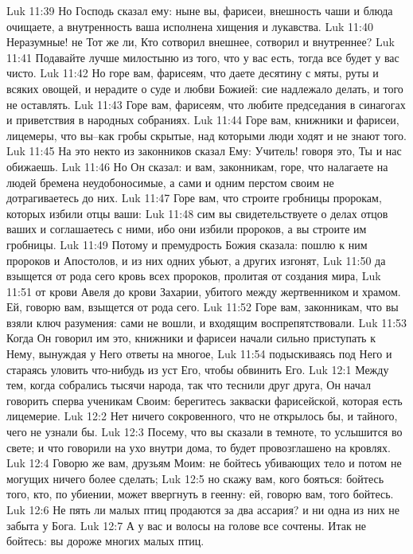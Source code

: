Luk 11:39  Но Господь сказал ему: ныне вы, фарисеи, внешность чаши и блюда очищаете, а внутренность ваша исполнена хищения и лукавства.
Luk 11:40  Неразумные! не Тот же ли, Кто сотворил внешнее, сотворил и внутреннее?
Luk 11:41  Подавайте лучше милостыню из того, что у вас есть, тогда все будет у вас чисто.
Luk 11:42  Но горе вам, фарисеям, что даете десятину с мяты, руты и всяких овощей, и нерадите о суде и любви Божией: сие надлежало делать, и того не оставлять.
Luk 11:43  Горе вам, фарисеям, что любите председания в синагогах и приветствия в народных собраниях.
Luk 11:44  Горе вам, книжники и фарисеи, лицемеры, что вы--как гробы скрытые, над которыми люди ходят и не знают того.
Luk 11:45  На это некто из законников сказал Ему: Учитель! говоря это, Ты и нас обижаешь.
Luk 11:46  Но Он сказал: и вам, законникам, горе, что налагаете на людей бремена неудобоносимые, а сами и одним перстом своим не дотрагиваетесь до них.
Luk 11:47  Горе вам, что строите гробницы пророкам, которых избили отцы ваши:
Luk 11:48  сим вы свидетельствуете о делах отцов ваших и соглашаетесь с ними, ибо они избили пророков, а вы строите им гробницы.
Luk 11:49  Потому и премудрость Божия сказала: пошлю к ним пророков и Апостолов, и из них одних убьют, а других изгонят,
Luk 11:50  да взыщется от рода сего кровь всех пророков, пролитая от создания мира,
Luk 11:51  от крови Авеля до крови Захарии, убитого между жертвенником и храмом. Ей, говорю вам, взыщется от рода сего.
Luk 11:52  Горе вам, законникам, что вы взяли ключ разумения: сами не вошли, и входящим воспрепятствовали.
Luk 11:53  Когда Он говорил им это, книжники и фарисеи начали сильно приступать к Нему, вынуждая у Него ответы на многое,
Luk 11:54  подыскиваясь под Него и стараясь уловить что-нибудь из уст Его, чтобы обвинить Его.
Luk 12:1  Между тем, когда собрались тысячи народа, так что теснили друг друга, Он начал говорить сперва ученикам Своим: берегитесь закваски фарисейской, которая есть лицемерие.
Luk 12:2  Нет ничего сокровенного, что не открылось бы, и тайного, чего не узнали бы.
Luk 12:3  Посему, что вы сказали в темноте, то услышится во свете; и что говорили на ухо внутри дома, то будет провозглашено на кровлях.
Luk 12:4  Говорю же вам, друзьям Моим: не бойтесь убивающих тело и потом не могущих ничего более сделать;
Luk 12:5  но скажу вам, кого бояться: бойтесь того, кто, по убиении, может ввергнуть в геенну: ей, говорю вам, того бойтесь.
Luk 12:6  Не пять ли малых птиц продаются за два ассария? и ни одна из них не забыта у Бога.
Luk 12:7  А у вас и волосы на голове все сочтены. Итак не бойтесь: вы дороже многих малых птиц.
